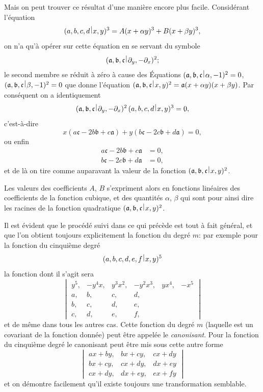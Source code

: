 \documentclass[11pt,a4paper]{book}
\theoremstyle{plain}
\newcommand{\wrule}{\hspace{-0.1em}\mid\hspace{-0.1em}}
\begin{document}
Mais on peut trouver ce r\'{e}sultat d'une mani\`{e}re encore plus facile. Consid\'{e}rant l'\'{e}quation
\[
(a,b,c,d\,\raisebox{0.5ex}{$\wrule$}\,x,y)^3=A(x+\alpha y)^3+B(x+\beta y)^3,
\]
on n'a qu'\`{a} op\'{e}rer sur cette \'{e}quation en se servant du symbole
\[
(\mathfrak{a},\mathfrak{b},\mathfrak{c}\,\raisebox{0.5ex}{$\wrule$}\,\partial_y,-\partial_x)^2;
\]
le second membre se r\'{e}duit \`{a} z\'{e}ro \`{a} cause des \'{E}quations $(\mathfrak{a},\mathfrak{b},\mathfrak{c}\,\raisebox{0.5ex}{$\wrule$}\,\alpha,-1)^2=0$, $(\mathfrak{a},\mathfrak{b},\mathfrak{c}\,\raisebox{0.5ex}{$\wrule$}\,\beta,-1)^2=0$ que donne l'\'{e}quation $(\mathfrak{a},\mathfrak{b},\mathfrak{c}\,\raisebox{0.5ex}{$\wrule$}\,x,y)^2=\mathfrak{a}(x+\alpha y)(x+\beta y)$. Par cons\'{e}quent on a identiquement
\[
(\mathfrak{a},\mathfrak{b},\mathfrak{c}\,\raisebox{0.5ex}{$\wrule$}\,\partial_y,-\partial_x)^2\,(a,b,c,d\,\raisebox{0.5ex}{$\wrule$}\,x,y)^3=0,
\]
c'est-\`{a}-dire
\[
x(a\mathfrak{c}-2b\mathfrak{b}+c\mathfrak{a})+y(b\mathfrak{c}-2c\mathfrak{b}+d\mathfrak{a})=0,
\]
ou enfin
\begin{align*}
a\mathfrak{c}-2b\mathfrak{b}+c\mathfrak{a}&=0,\\
b\mathfrak{c}-2c\mathfrak{b}+d\mathfrak{a}&=0,
\end{align*}
et de l\`{a} on tire comme auparavant la valeur de la fonction $(\mathfrak{a},\mathfrak{b},\mathfrak{c}\,\raisebox{0.5ex}{$\wrule$}\,x,y)^2$.

Les valeurs des coefficients $A$, $B$ s'expriment alors en fonctions lin\'{e}aires des coefficients de la fonction cubique, et des quantit\'{e}s $\alpha$, $\beta$ qui sont pour ainsi dire les racines de la fonction quadratique $(\mathfrak{a},\mathfrak{b},\mathfrak{c}\,\raisebox{0.5ex}{$\wrule$}\,x,y)^2$.

Il est \'{e}vident que le proc\'{e}d\'{e} suivi dans ce qui pr\'{e}c\`{e}de est tout \`{a} fait g\'{e}n\'{e}ral, et que l'on obtient toujours explicitement la fonction du degr\'{e} $m$: par exemple pour la fonction du cinqui\`{e}me degr\'{e}
\[
(a,b,c,d,e,f\,\raisebox{0.5ex}{$\wrule$}\,x,y)^5
\]
la fonction dont il s'agit sera
\[
\begin{vmatrix}
y^5, & -y^4x, & y^3x^2, & -y^2x^3, & yx^4, & -x^5\\
a, & b, & c, & d, & & \\
b, & c, & d, & e, & & \\
c, & d, & e, & f, & &
\end{vmatrix}
\]
et de m\^{e}me dans tous les autres cas. Cette fonction du degr\'{e} $m$ (laquelle est un covariant de la fonction donn\'{e}e) peut \^{e}tre appel\'{e}e le \textit{canonisant}. Pour la fonction du cinqui\`{e}me degr\'{e} le canonisant peut \^{e}tre mis sous cette autre forme
\[
\begin{vmatrix}
ax+by, & bx+cy, & cx+dy\\
bx+cy, & cx+dy, & dx+ey\\
cx+dy, & dx+ey, & ex+fy
\end{vmatrix}
\]
et on d\'{e}montre facilement qu'il existe toujours une transformation semblable.
\newpage
\end{document}
